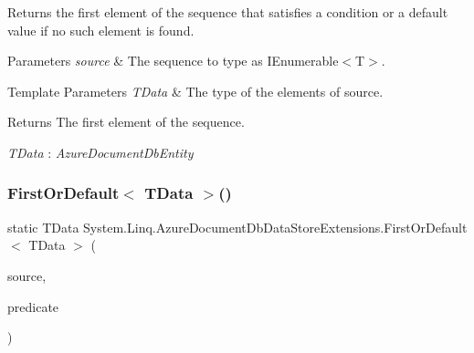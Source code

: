 Returns the first element of the sequence that satisfies a condition or a default value if no such element is found. 


\begin{DoxyParams}{Parameters}
{\em source} & The sequence to type as I\+Enumerable$<$\+T$>$.\\
\hline
\end{DoxyParams}

\begin{DoxyTemplParams}{Template Parameters}
{\em T\+Data} & The type of the elements of source.\\
\hline
\end{DoxyTemplParams}
\begin{DoxyReturn}{Returns}
The first element of the sequence.
\end{DoxyReturn}
\begin{Desc}
\item[Type Constraints]\begin{description}
\item[{\em T\+Data} : {\em Azure\+Document\+Db\+Entity}]\end{description}
\end{Desc}
\mbox{\label{classSystem_1_1Linq_1_1AzureDocumentDbDataStoreExtensions_ae3870009eab2cb1bf22b447d9fa51ec8}} 
\subsubsection{\texorpdfstring{First\+Or\+Default$<$ T\+Data $>$()}{FirstOrDefault< TData >()}\hspace{0.1cm}{\footnotesize\ttfamily [2/2]}}
{\footnotesize\ttfamily static T\+Data System.\+Linq.\+Azure\+Document\+Db\+Data\+Store\+Extensions.\+First\+Or\+Default$<$ T\+Data $>$ (\begin{DoxyParamCaption}\item[{this \hyperlink{classCqrs_1_1Azure_1_1DocumentDb_1_1DataStores_1_1AzureDocumentDbDataStore}{Azure\+Document\+Db\+Data\+Store}$<$ T\+Data $>$}]{source,  }\item[{Func$<$ T\+Data, bool $>$}]{predicate }\end{DoxyParamCaption})\hspace{0.3cm}{\ttfamily [static]}}



